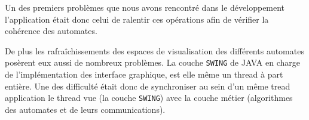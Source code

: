 Un des premiers problèmes que nous avons rencontré dans le développement l'application était donc celui de \og ralentir \fg{} ces opérations afin de vérifier la cohérence des automates.

De plus les rafraîchissements des espaces de visualisation des différents automates posèrent eux aussi de nombreux problèmes. La couche \texttt{SWING} de \textsc{JAVA} en charge de l'implémentation des interface graphique, est elle même un thread à part entière. Une des difficulté était donc de synchroniser au sein d'un même tread application le thread \og vue \fg{} (la couche \texttt{SWING}) avec la couche \og métier \fg{} (algorithmes des automates et de leurs communications).


